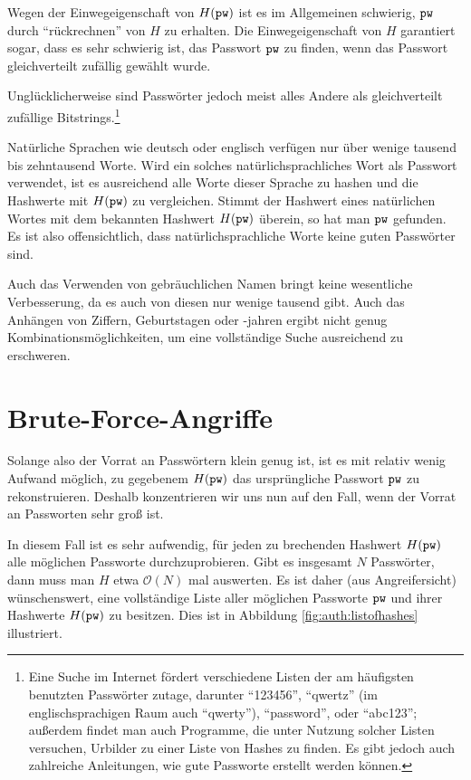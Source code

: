 Wegen der Einwegeigenschaft von $H(\texttt{pw})$ ist es im Allgemeinen
schwierig, $\texttt{pw}$ durch "`rückrechnen"' von $H$ zu erhalten. Die
Einwegeigenschaft von $H$ garantiert sogar, dass es sehr schwierig ist,
das Passwort $\texttt{pw}$ zu finden, wenn das Passwort gleichverteilt zufällig
gewählt wurde.

Unglücklicherweise sind Passwörter jedoch meist alles Andere als
gleichverteilt zufällige Bitstrings.\footnote{ Eine Suche im Internet
fördert verschiedene Listen der am häufigsten benutzten Passwörter
zutage, darunter "`123456"', "`qwertz"' (im englischsprachigen Raum auch
"`qwerty"'), "`password"', oder "`abc123"'; außerdem findet man auch
Programme, die unter Nutzung solcher Listen versuchen, Urbilder zu einer
Liste von Hashes zu finden. Es gibt jedoch auch zahlreiche Anleitungen,
wie gute Passworte erstellt werden können.  }

Natürliche Sprachen wie deutsch oder englisch verfügen nur über wenige
tausend bis zehntausend Worte.  Wird ein solches natürlichsprachliches
Wort als Passwort verwendet, ist es ausreichend alle Worte dieser
Sprache zu hashen und die Hashwerte mit $H(\texttt{pw})$ zu vergleichen. Stimmt
der Hashwert eines natürlichen Wortes mit dem bekannten Hashwert
$H(\texttt{pw})$ überein, so hat man $\texttt{pw}$ gefunden.  Es ist also
offensichtlich, dass natürlichsprachliche Worte keine guten Passwörter
sind.

Auch das Verwenden von gebräuchlichen Namen bringt keine wesentliche
Verbesserung, da es auch von diesen nur wenige tausend gibt. Auch das
Anhängen von Ziffern, Geburtstagen oder -jahren ergibt nicht genug
Kombinationsmöglichkeiten, um eine vollständige Suche ausreichend zu
erschweren.

\section{Brute-Force-Angriffe}

Solange also der Vorrat an Passwörtern klein genug ist, ist es mit
relativ wenig Aufwand möglich, zu gegebenem $H(\texttt{pw})$ das ursprüngliche
Passwort $\texttt{pw}$ zu rekonstruieren. Deshalb konzentrieren wir uns nun auf
den Fall, wenn der Vorrat an Passworten sehr groß ist.

In diesem Fall ist es sehr aufwendig, für jeden zu brechenden Hashwert
$H(\texttt{pw})$ alle möglichen Passworte durchzuprobieren. Gibt es insgesamt
$N$ Passwörter, dann muss man $H$ etwa $\mathcal{O}(N)$ mal
auswerten. Es ist daher (aus Angreifersicht) wünschenswert, eine
vollständige Liste aller möglichen Passworte $\texttt{pw}$ und ihrer Hashwerte
$H(\texttt{pw})$ zu besitzen. Dies ist in Abbildung \ref{fig:auth:listofhashes}
illustriert.

